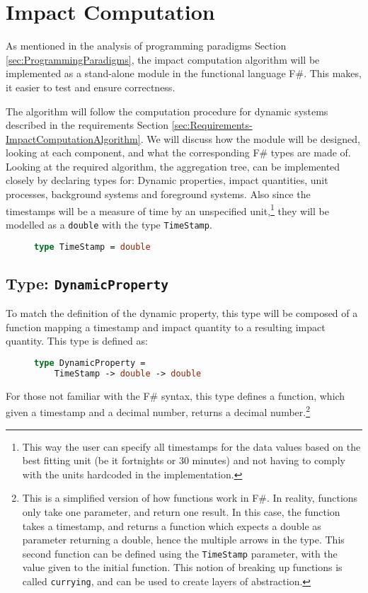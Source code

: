 \section{Impact Computation} \label{sec:Design-ImpactComputation}

As mentioned in the analysis of programming paradigms Section \ref{sec:ProgrammingParadigms}, the impact computation algorithm will be implemented as a stand-alone module in the functional language F\#. This makes, it easier to test and ensure correctness.

The algorithm will follow the computation procedure for dynamic systems described in the requirements Section \ref{sec:Requirements-ImpactComputationAlgorithm}. We will discuss how the module will be designed, looking at each component, and what the corresponding F\# types are made of. 
Looking at the required algorithm, the aggregation tree, can be implemented closely by declaring types for: Dynamic properties, impact quantities, unit processes, background systems and foreground systems. Also since the timestamps will be a measure of time by an unspecified unit,\footnote{This way the user can specify all timestamps for the data values based on the best fitting unit (be it fortnights or 30 minutes) and not having to comply with the units hardcoded in the implementation.} they will be modelled as a \texttt{double} with the type \texttt{TimeStamp}. 

\begin{figure}[H]
\begin{lstlisting}[language=Fsharp]
type TimeStamp = double
\end{lstlisting}
\end{figure}

\subsection{Type: \texttt{DynamicProperty}}
To match the definition of the dynamic property, this type will be composed of a function mapping a timestamp and impact quantity to a resulting impact quantity. This type is defined as:

\begin{figure}[H]
\begin{lstlisting}[language=Fsharp]
type DynamicProperty =  
    TimeStamp -> double -> double
\end{lstlisting}
\end{figure}

For those not familiar with the F\# syntax, this type defines a function, which given a timestamp and a decimal number, returns a decimal number.\footnote{This is a simplified version of how functions work in F\#. In reality, functions only take one parameter, and return one result. In this case, the function takes a timestamp, and returns a function which expects a double as parameter returning a double, hence the multiple arrows in the type. This second function can be defined using the \texttt{TimeStamp} parameter, with the value given to the initial function. This notion of breaking up functions is called \texttt{currying}, and can be used to create layers of abstraction.}

